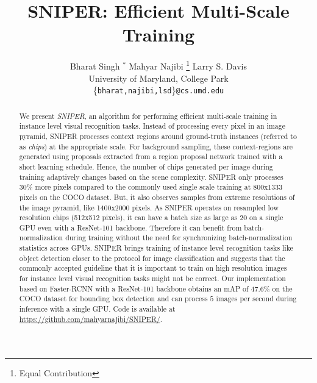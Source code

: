 \documentclass{article}
\title{SNIPER: Efficient Multi-Scale Training}
\author{
  Bharat Singh $^*$  \hspace{1.5cm}  Mahyar Najibi \thanks{Equal Contribution} \hspace{1.5cm}  Larry S. Davis \\
  University of Maryland, College Park\\
  \{\texttt{bharat,najibi,lsd}\}\texttt{@cs.umd.edu} 
}
\begin{document}

\maketitle

\begin{abstract}
We present \textit{SNIPER}, an algorithm for performing efficient multi-scale training in instance level visual recognition tasks. Instead of processing every pixel in an image pyramid, SNIPER processes context regions around ground-truth instances (referred to as \textit{chips}) at the appropriate scale. For background sampling, these context-regions are generated using proposals extracted from a region proposal network trained with a short learning schedule. Hence, the number of chips generated per image during training adaptively changes based on the scene complexity. SNIPER only processes 30\% more pixels compared to the commonly used single scale training at 800x1333 pixels on the COCO dataset. But, it also observes samples from extreme resolutions of the image pyramid, like 1400x2000 pixels. As SNIPER operates on resampled low resolution chips (512x512 pixels), it can have a batch size as large as $20$ on a single GPU even with a ResNet-101 backbone. Therefore it can benefit from batch-normalization during training without the need for synchronizing batch-normalization statistics across GPUs. SNIPER brings training of instance level recognition tasks like object detection closer to the protocol for image classification and suggests that the commonly accepted guideline that it is important to train on high resolution images for instance level visual recognition tasks might not be correct. Our implementation based on Faster-RCNN with a ResNet-101 backbone obtains an mAP of $47.6$\% on the COCO dataset for bounding box detection and can process $5$ images per second during inference with a single GPU. Code is available at \url{https://github.com/mahyarnajibi/SNIPER/}.
 
\end{abstract}
\end{document}
